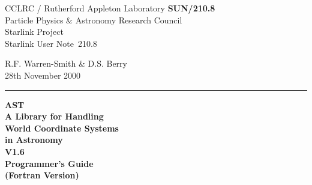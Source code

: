 \documentclass[twoside,11pt]{article}
\newcommand{\stardoccategory}  {Starlink User Note}
\newcommand{\stardocinitials}  {SUN}
\newcommand{\stardocnumber}    {210.8}
\newcommand{\stardocauthors}   {R.F. Warren-Smith \& D.S. Berry}
\newcommand{\stardocdate}      {28th November 2000}
\newcommand{\stardoctitle}     {AST\\
                                A Library for Handling\\
                                World Coordinate Systems\\
                                in Astronomy}
\newcommand{\stardocversion}   {V1.6}
\newcommand{\stardocmanual}    {Programmer's Guide\\(Fortran Version)}
\newcommand{\stardocname}{\stardocinitials /\stardocnumber}
\newenvironment{latexonly}{}{}
\begin{document}
\thispagestyle{empty}

\begin{latexonly}
   CCLRC / {\sc Rutherford Appleton Laboratory} \hfill {\bf \stardocname}\\
   {\large Particle Physics \& Astronomy Research Council}\\
   {\large Starlink Project\\}
   {\large \stardoccategory\ \stardocnumber}
   \begin{flushright}
   \stardocauthors\\
   \stardocdate
   \end{flushright}
   \vspace{-4mm}
   \rule{\textwidth}{0.5mm}
   \vspace{-7mm}
   \begin{center}
   {\Huge\bf  \stardoctitle \\ [2.0ex]}
   {\LARGE\bf \stardocversion \\ [1.0ex]}
   {\Huge\bf  \stardocmanual}
   \end{center}


\end{latexonly}
\end{document}
